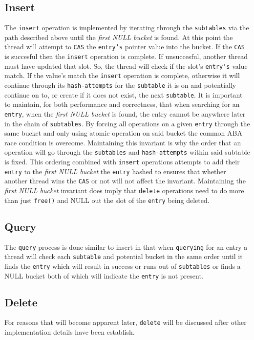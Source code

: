 \subsection{Insert}
The \texttt{insert} operation is implemented by iterating through the
\texttt{subtables} via the path described above until the
\textit{first NULL bucket} is found. At this point the thread will
attempt to \texttt{CAS} the \texttt{entry's} pointer value into the
bucket. If the \texttt{CAS} is succesful then the \texttt{insert}
operation is complete. If unsuccesful, another thread must have
updated that slot. So, the thread will check if the slot's
\texttt{entry's} value match. If the value's match the \texttt{insert}
operation is complete, otherwise it will continue through its
\texttt{hash-attempts} for the \texttt{subtable} it is on and
potentially continue on to, or create if it does not exist, the next
\texttt{subtable}. It is important to maintain, for both performance
and correctness, that when searching for an \texttt{entry}, when the
\textit{first NULL bucket} is found, the entry cannot be anywhere
later in the chain of \texttt{subtables}. By forcing all operations on
a given \texttt{entry} through the same bucket and only using atomic
operation on said bucket the common ABA race condition is
overcome. Maintaining this invariant is why the order that an
operation will go through the \texttt{subtables} and
\texttt{hash-attempts} within said subtable is fixed. This ordering
combined with \texttt{insert} operations attempts to add their
\texttt{entry} to the \textit{first NULL bucket} the \texttt{entry}
hashed to ensures that whether another thread wins the \texttt{CAS} or
not will not affect the invariant. Maintaining the \textit{first NULL
  bucket} invariant does imply that \texttt{delete} operations need to
do more than just \texttt{free()} and NULL out the slot of the
\texttt{entry} being deleted.

\subsection{Query}
The \texttt{query} process is done similar to insert in that when
\texttt{querying} for an entry a thread will check each
\texttt{subtable} and potential bucket in the same order until it
finds the \texttt{entry} which will result in success or runs out of
\texttt{subtables} or finds a NULL bucket both of which will indicate
the \texttt{entry} is not present.

\subsection{Delete}
For reasons that will become apparent later, \texttt{delete} will be
discussed after other implementation details have been establish.


